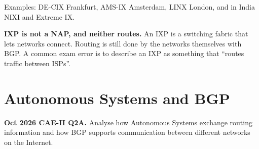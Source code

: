\documentclass[11pt,a4paper]{article}
\begin{document}
Examples: DE-CIX Frankfurt, AMS-IX Amsterdam, LINX London, and in India NIXI and Extreme IX.

\begin{dangerbox}
\textbf{IXP is not a NAP, and neither routes.} An IXP is a switching fabric that lets networks connect. Routing is still done by the networks themselves with BGP. A common exam error is to describe an IXP as something that ``routes traffic between ISPs''.
\end{dangerbox}

\section{Autonomous Systems and BGP}

\begin{pyqbox}
\textbf{Oct 2026 CAE-II Q2A.} Analyse how Autonomous Systems exchange routing information and how BGP supports communication between different networks on the Internet.
\end{pyqbox}
\end{document}
